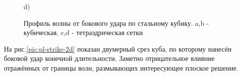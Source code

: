 \begin{figure}
\begin{minipage}{0.35\linewidth}
 d)\\
\end{minipage}
\caption{Профиль волны от бокового удара по стальному кубику. a,b - кубическая, c,d - тетраэдрическая сетки}
\label{pic:pl-wave}
\end{figure}

На рис.\ref{pic:pl-strike-2d} показан двумерный срез куба, по которому нанесён боковой удар конечной длительности. Заметно отрицательное влияние отражённых от границы волн, размывающих интересующее плоское решение.

